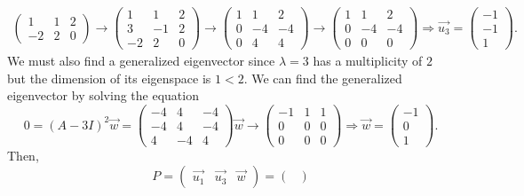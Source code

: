 \documentclass{exam}
\begin{document}
\begin{solution}
\begin{align*}
\begin{pmatrix}
            1 & 1 & 2 \\
            -2 & 2 & 0 
        \end{pmatrix}
        \to \begin{pmatrix}
            1 & 1 & 2 \\
            3 & -1 & 2 \\
            -2 & 2 & 0
        \end{pmatrix}
        \to \begin{pmatrix}
            1 & 1 & 2 \\
            0 & -4 & -4 \\
            0 & 4 & 4
        \end{pmatrix}
        \to \begin{pmatrix}
            1 & 1 & 2 \\
            0 & -4 & -4 \\
            0 & 0 & 0
        \end{pmatrix}
        \Rightarrow \vec{u_3} = \begin{pmatrix}
            -1 \\ -1 \\ 1
        \end{pmatrix}.
    \end{align*}
    We must also find a generalized eigenvector since $\lambda = 3$ has a multiplicity of $2$ but the dimension of its eigenspace is $1 < 2$. We can find the generalized eigenvector by solving the equation
    \[
        0 = (A-3I)^2\vec{w} = \begin{pmatrix}
            -4 & 4 & -4 \\
            -4 & 4 & -4 \\
            4 & -4 & 4
        \end{pmatrix}\vec{w}
        \to \begin{pmatrix}
            -1 & 1 & 1 \\
            0 & 0 & 0 \\
            0 & 0 & 0
        \end{pmatrix}
        \Rightarrow \vec{w} = \begin{pmatrix}
            -1 \\ 0 \\ 1
        \end{pmatrix}.
    \]
    Then, 
    \[
        P = \begin{pmatrix}
            \vec{u_1} & \vec{u_3} & \vec{w}
        \end{pmatrix} = \begin{pmatrix}

\end{pmatrix}\]
\end{solution}
\end{document}
